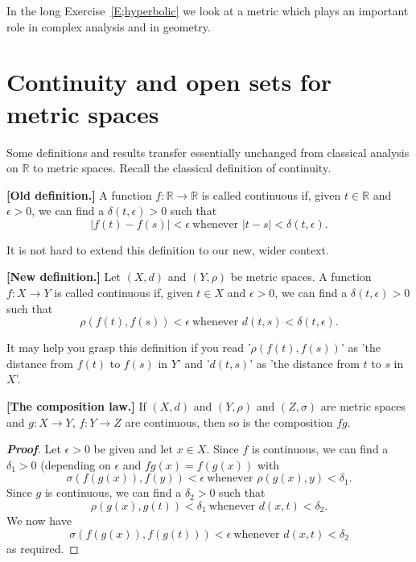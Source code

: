 In the long Exercise~\ref{E;hyperbolic} we look at a metric
which plays an important role in complex analysis and
in geometry.





\section{Continuity and open sets for metric spaces}
Some definitions and results transfer essentially unchanged
from classical analysis on ${\mathbb R}$ to metric spaces.
Recall the classical definition of continuity.
\begin{definition}{\bf [Old definition.]} 
A function $f:{\mathbb R}\rightarrow{\mathbb R}$
is called continuous if, given $t\in{\mathbb R}$ and $\epsilon>0$,
we can find a $\delta(t,\epsilon)>0$ such that
\[|f(t)-f(s)|<\epsilon\ \text{whenever $|t-s|<\delta(t,\epsilon)$}.\]
\end{definition}
It is not hard to extend this definition to our new, wider context.
\begin{definition}{\bf [New definition.]}\label{D;metric continuity}
Let $(X,d)$ and $(Y,\rho)$ be metric spaces. 
A function $f:X\rightarrow Y$
is called continuous if, given $t\in X$ and $\epsilon>0$,
we can find a $\delta(t,\epsilon)>0$ such that
\[\rho(f(t),f(s))<\epsilon\ \text{whenever $d(t,s)<\delta(t,\epsilon)$}.\]
\end{definition}
It may help you grasp this definition
if you read '$\rho(f(t),f(s))$' as 'the distance from $f(t)$ to $f(s)$
in $Y$'
and '$d(t,s)$' as 'the distance from $t$ to $s$ in $X$'.

\begin{theorem}{\bf [The composition law.]} \label{T;composition metric}
If $(X,d)$ and $(Y,\rho)$
and $(Z,\sigma)$ are metric spaces and $g:X\rightarrow Y$, $f:Y\rightarrow Z$
are continuous, then so is the composition $fg$.
\end{theorem}
\begin{proof}[\bf Proof] Let $\epsilon>0$ be given and let $x\in X$. Since
$f$ is continuous, we can find a $\delta_{1}>0$
(depending on $\epsilon$ and $fg(x)=f(g(x))$ with
\[\sigma(f(g(x)),f(y))<\epsilon\ \text{whenever $\rho(g(x),y)<\delta_{1}$}.\]
Since $g$ is continuous, we can find a $\delta_{2}>0$ such that
\[\rho(g(x),g(t))<\delta_{1}\ \text{whenever $d(x,t)<\delta_{2}$}.\]
We now have 
\[\sigma(f(g(x)),f(g(t)))<\epsilon\ \text{whenever $d(x,t)<\delta_{2}$}\]
as required.
\end{proof}




